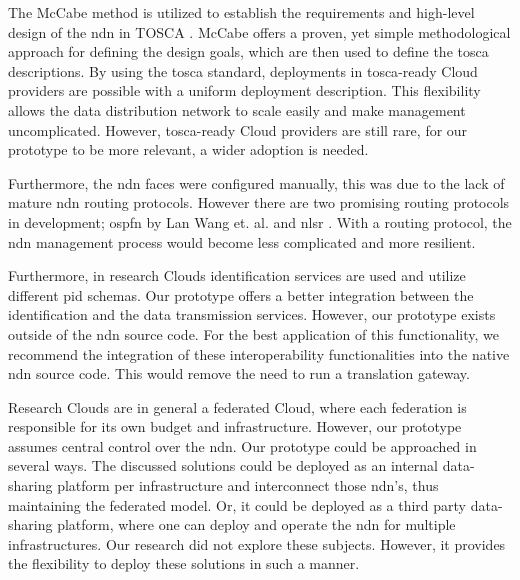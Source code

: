 \documentclass[conference]{IEEEtran}
\begin{document}
The McCabe method is utilized to establish the requirements and high-level design of the \gls{ndn} in TOSCA \cite{mccabe2010network}. McCabe offers a proven, yet simple methodological approach for defining the design goals, which are then used to define the \gls{tosca} descriptions. By using the \gls{tosca} standard, deployments in \gls{tosca}-ready Cloud providers are possible with a uniform deployment description. This flexibility allows the data distribution network to scale easily and make management uncomplicated. However, \gls{tosca}-ready Cloud providers are still rare, for our prototype to be more relevant, a wider adoption is needed.


Furthermore, the \gls{ndn} faces were configured manually, this was due to the lack of mature \gls{ndn} routing protocols. However there are two promising routing protocols in development; \gls{ospfn} by Lan Wang et. al. \cite{ndn-ospfn2} and \gls{nlsr} \cite{nlsr}. With a routing protocol, the \gls{ndn} management process would become less complicated and more resilient.

Furthermore, in research Clouds identification services are used and utilize different \gls{pid} schemas. Our prototype offers a better integration between the identification and the data transmission services. However, our prototype exists outside of the \gls{ndn} source code. For the best application of this functionality, we recommend the integration of these interoperability functionalities into the native \gls{ndn} source code. This would remove the need to run a translation gateway.

Research Clouds are in general a federated Cloud, where each federation is responsible for its own budget and infrastructure. However, our prototype assumes central control over the \gls{ndn}. Our prototype could be approached in several ways. The discussed solutions could be deployed as an internal data-sharing platform per infrastructure and interconnect those \gls{ndn}'s, thus maintaining the federated model. Or, it could be deployed as a third party data-sharing platform, where one can deploy and operate the \gls{ndn} for multiple infrastructures. Our research did not explore these subjects. However, it provides the flexibility to deploy these solutions in such a manner.
\end{document}
